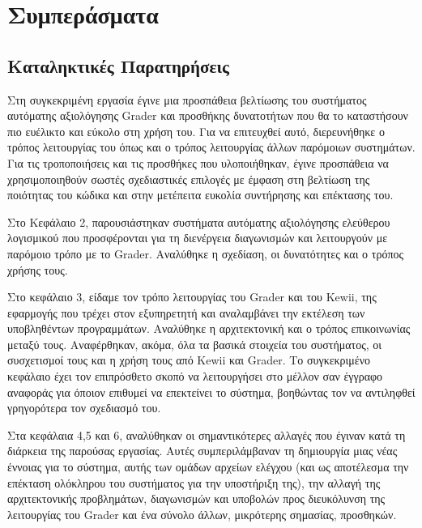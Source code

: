 \documentclass[diploma]{softlab-thesis}
\begin{document}
\chapter{Συμπεράσματα}

\section{Καταληκτικές Παρατηρήσεις}

Στη συγκεκριμένη εργασία έγινε μια προσπάθεια βελτίωσης του συστήματος
αυτόματης αξιολόγησης Grader και προσθήκης δυνατοτήτων που θα το καταστήσουν
πιο ευέλικτο και εύκολο στη χρήση του. Για να επιτευχθεί αυτό, διερευνήθηκε ο
τρόπος λειτουργίας του όπως και ο τρόπος λειτουργίας άλλων παρόμοιων
συστημάτων. Για τις τροποποιήσεις και τις προσθήκες που υλοποιήθηκαν, έγινε
προσπάθεια να χρησιμοποιηθούν σωστές σχεδιαστικές επιλογές με έμφαση στη
βελτίωση της ποιότητας του κώδικα και στην μετέπειτα ευκολία συντήρησης και
επέκτασης του.

\bigskip

Στο Κεφάλαιο 2, παρουσιάστηκαν συστήματα αυτόματης αξιολόγησης ελεύθερου
λογισμικού που προσφέρονται για τη διενέργεια διαγωνισμών και λειτουργούν με
παρόμοιο τρόπο με το Grader. Αναλύθηκε η σχεδίαση, οι δυνατότητες και ο
τρόπος χρήσης τους.

\bigskip

Στο κεφάλαιο 3, είδαμε τον τρόπο λειτουργίας του Grader και του Kewii, της
εφαρμογής που τρέχει στον εξυπηρετητή και αναλαμβάνει την εκτέλεση των
υποβληθέντων προγραμμάτων. Αναλύθηκε η αρχιτεκτονική και ο τρόπος επικοινωνίας
μεταξύ τους. Αναφέρθηκαν, ακόμα, όλα τα βασικά στοιχεία του συστήματος, οι
συσχετισμοί τους και η χρήση τους από Kewii και Grader. Το συγκεκριμένο
κεφάλαιο έχει τον επιπρόσθετο σκοπό να λειτουργήσει στο μέλλον σαν έγγραφο
αναφοράς για όποιον επιθυμεί να επεκτείνει το σύστημα, βοηθώντας τον να
αντιληφθεί γρηγορότερα τον σχεδιασμό του.

\bigskip

Στα κεφάλαια 4,5 και 6, αναλύθηκαν οι σημαντικότερες αλλαγές που έγιναν κατά τη
διάρκεια της παρούσας εργασίας. Αυτές συμπεριλάμβαναν τη δημιουργία μιας νέας
έννοιας για το σύστημα, αυτής των ομάδων αρχείων ελέγχου (και ως αποτέλεσμα την
επέκταση ολόκληρου του συστήματος για την υποστήριξη της), την αλλαγή της
αρχιτεκτονικής προβλημάτων, διαγωνισμών και υποβολών προς διευκόλυνση της
λειτουργίας του Grader και ένα σύνολο άλλων, μικρότερης σημασίας, προσθηκών.

\bigskip
\end{document}
